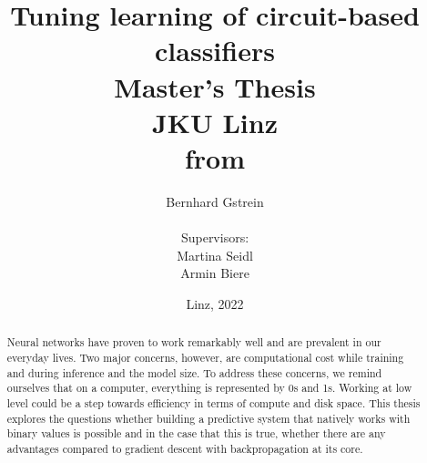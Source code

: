 \documentclass[a4paper,12pt]{article}
\begin{document}
\usetikzlibrary{patterns}

%
    \title{Tuning learning of circuit-based classifiers\\
    \vspace{2em}
    Master's Thesis\\
    \vspace{2em}
    JKU Linz\\
    \vspace{1.5em}
    from}

    \author{
 	\LARGE Bernhard Gstrein\\
 	\vspace{.5em} \\
 	Supervisors:\\
 	Martina Seidl\\
 	Armin Biere\\
 	\vspace{1em}
	}
    
\date{Linz, 2022}

\maketitle
   
\begin{abstract}
\noindent Neural networks have proven to work remarkably well and are prevalent in our everyday lives. Two major concerns, however, are computational cost while training and during inference and the model size. To address these concerns, we remind ourselves that on a computer, everything is represented by 0s and 1s. Working at low level could be a step towards efficiency in terms of compute and disk space. This thesis explores the questions whether building a predictive system that natively works with binary values is possible and in the case that this is true, whether there are any advantages compared to gradient descent with backpropagation at its core.
\end{abstract}
   
\newpage
   
\tableofcontents
 
\newpage
    












\end{document}
